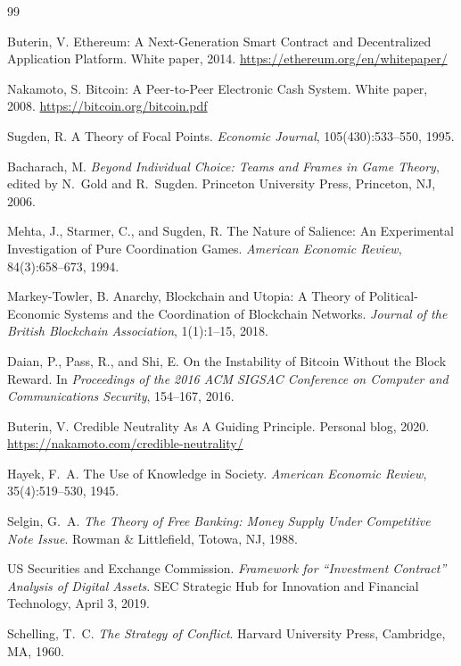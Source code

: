 \documentclass[11pt,a4paper]{article}
\theoremstyle{definition}
\theoremstyle{remark}
\begin{document}
\begin{thebibliography}{99}

Buterin, V.
\newblock Ethereum: A Next-Generation Smart Contract and
  Decentralized Application Platform.
\newblock White paper, 2014.
\newblock \url{https://ethereum.org/en/whitepaper/}

Nakamoto, S.
\newblock Bitcoin: A Peer-to-Peer Electronic Cash System.
\newblock White paper, 2008.
\newblock \url{https://bitcoin.org/bitcoin.pdf}

Sugden, R.
\newblock A Theory of Focal Points.
\newblock \emph{Economic Journal}, 105(430):533--550, 1995.

Bacharach, M.
\newblock \emph{Beyond Individual Choice: Teams and Frames in
  Game Theory}, edited by N.~Gold and R.~Sugden.
\newblock Princeton University Press, Princeton, NJ, 2006.

Mehta, J., Starmer, C., and Sugden, R.
\newblock The Nature of Salience: An Experimental Investigation
  of Pure Coordination Games.
\newblock \emph{American Economic Review}, 84(3):658--673, 1994.

Markey-Towler, B.
\newblock Anarchy, Blockchain and Utopia: A Theory of Political-Economic
  Systems and the Coordination of Blockchain Networks.
\newblock \emph{Journal of the British Blockchain Association},
  1(1):1--15, 2018.

Daian, P., Pass, R., and Shi, E.
\newblock On the Instability of Bitcoin Without the Block Reward.
\newblock In \emph{Proceedings of the 2016 ACM SIGSAC Conference on
  Computer and Communications Security}, 154--167, 2016.

Buterin, V.
\newblock Credible Neutrality As A Guiding Principle.
\newblock Personal blog, 2020.
\newblock \url{https://nakamoto.com/credible-neutrality/}

Hayek, F.~A.
\newblock The Use of Knowledge in Society.
\newblock \emph{American Economic Review}, 35(4):519--530, 1945.

Selgin, G.~A.
\newblock \emph{The Theory of Free Banking: Money Supply Under
  Competitive Note Issue}.
\newblock Rowman \& Littlefield, Totowa, NJ, 1988.

US Securities and Exchange Commission.
\newblock \emph{Framework for ``Investment Contract'' Analysis of
  Digital Assets}.
\newblock SEC Strategic Hub for Innovation and Financial Technology,
  April 3, 2019.

Schelling, T.~C.
\newblock \emph{The Strategy of Conflict}.
\newblock Harvard University Press, Cambridge, MA, 1960.

\end{thebibliography}
\end{document}
